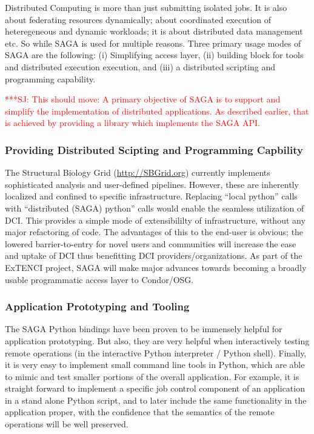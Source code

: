 \documentclass[12pt]{article}
\newcommand{\jhanote}[1]{ {\textcolor{red}     {***SJ: #1}}}
\newcommand{\jhanote}[1]{}
\begin{document}
Distributed Computing is more than just submitting isolated jobs.  It
is also about federating resources dynamically; about coordinated
execution of heteregeneous and dynamic workloads; it is about
distributed data management etc. So while SAGA is used for multiple reasons. Three primary usage modes of SAGA
are the following: (i) Simplifying access layer, (ii) building block
for tools and distributed execution execution, and (iii) a distributed
scripting and programming capability.


\jhanote{This should move: A primary objective of SAGA is to support
  and simplify the implementation of distributed applications.  As
  described earlier, that is achieved by providing a library which
  implements the SAGA API.}


\subsubsection*{Providing Distributed Scipting and Programming Capbility}
The Structural Biology Grid (\url{http://SBGrid.org}) currently
implements sophisticated analysis and user-defined pipelines. However,
these are inherently localized and confined to specific
infrastructure.  Replacing ``local python'' calls with ``distributed
(SAGA) python'' calls would enable the seamless utilization of
DCI. This provides a simple mode of extensibililty of infrastructure,
without any major refactoring of code. The advantages of this to the
end-user is obvious; the lowered barrier-to-entry for novel users and
communities will increase the ease and uptake of DCI thus benefitting
DCI providers/organizations.  As part of the ExTENCI project, SAGA
will make major advances towards becoming a broadly usable
programmatic access layer to Condor/OSG.

\subsubsection*{Application Prototyping and Tooling}

The SAGA Python bindings have been proven to be immensely helpful for
application prototyping.  But also, they are very helpful when
interactively testing remote operations (in the interactive Python
interpreter / Python shell).  Finally, it is very easy to implement
small command line tools in Python, which are able to mimic and test
smaller portions of the overall application.  For example, it is
straight forward to implement a specific job control component of an
application in a stand alone Python script, and to later include the
same functionality in the application proper, with the confidence that
the semantics of the remote operations will be well
preserved. %
\end{document}
